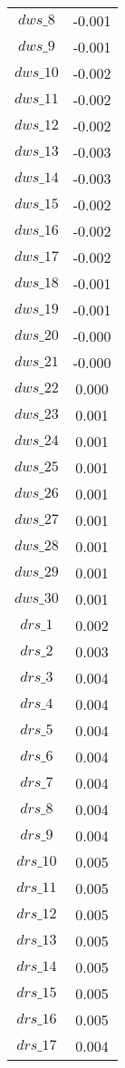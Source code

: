\begin{center}
\begin{longtable}{cc}
$dws\_8$ 	 & 	 -0.001 \\
$dws\_9$ 	 & 	 -0.001 \\
$dws\_10$ 	 & 	 -0.002 \\
$dws\_11$ 	 & 	 -0.002 \\
$dws\_12$ 	 & 	 -0.002 \\
$dws\_13$ 	 & 	 -0.003 \\
$dws\_14$ 	 & 	 -0.003 \\
$dws\_15$ 	 & 	 -0.002 \\
$dws\_16$ 	 & 	 -0.002 \\
$dws\_17$ 	 & 	 -0.002 \\
$dws\_18$ 	 & 	 -0.001 \\
$dws\_19$ 	 & 	 -0.001 \\
$dws\_20$ 	 & 	 -0.000 \\
$dws\_21$ 	 & 	 -0.000 \\
$dws\_22$ 	 & 	 0.000 \\
$dws\_23$ 	 & 	 0.001 \\
$dws\_24$ 	 & 	 0.001 \\
$dws\_25$ 	 & 	 0.001 \\
$dws\_26$ 	 & 	 0.001 \\
$dws\_27$ 	 & 	 0.001 \\
$dws\_28$ 	 & 	 0.001 \\
$dws\_29$ 	 & 	 0.001 \\
$dws\_30$ 	 & 	 0.001 \\
$drs\_1$ 	 & 	 0.002 \\
$drs\_2$ 	 & 	 0.003 \\
$drs\_3$ 	 & 	 0.004 \\
$drs\_4$ 	 & 	 0.004 \\
$drs\_5$ 	 & 	 0.004 \\
$drs\_6$ 	 & 	 0.004 \\
$drs\_7$ 	 & 	 0.004 \\
$drs\_8$ 	 & 	 0.004 \\
$drs\_9$ 	 & 	 0.004 \\
$drs\_10$ 	 & 	 0.005 \\
$drs\_11$ 	 & 	 0.005 \\
$drs\_12$ 	 & 	 0.005 \\
$drs\_13$ 	 & 	 0.005 \\
$drs\_14$ 	 & 	 0.005 \\
$drs\_15$ 	 & 	 0.005 \\
$drs\_16$ 	 & 	 0.005 \\
$drs\_17$ 	 & 	 0.004 \\

\end{longtable}
\end{center}
